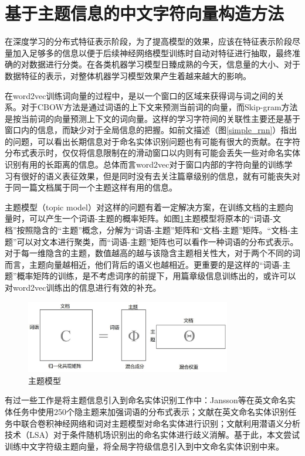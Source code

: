 \documentclass[winfonts,master,oneside,nobackinfo]{njuthesis}
\begin{document}
\section{基于主题信息的中文字符向量构造方法}

在深度学习的分布式特征表示阶段，为了提高模型的效果，应该在特征表示阶段尽量加入足够多的信息以便于后续神经网络模型训练时自动对特征进行抽取，最终准确的对数据进行分类。在各类机器学习模型日臻成熟的今天，信息量的大小、对于数据特征的表示，对整体机器学习模型效果产生着越来越大的影响。

在word2vec训练词向量的过程中，是以一个窗口的区域来获得词与词之间的关系。对于CBOW方法是通过词语的上下文来预测当前词的向量，而Skip-gram方法是按当前词的向量预测上下文的词向量。这样的学习字符间的关联性主要还是基于窗口内的信息，而缺少对于全局信息的把握。如前文描述（图\ref{simple_rnn}）指出的问题，可以看出长期信息对于命名实体识别问题也有可能有很大的贡献。在字符分布式表示时，仅仅将信息限制在的滑动窗口以内则有可能会丢失一些对命名实体识别有用的长距离的信息。总体而言word2vec对于窗口内部的字符向量的训练学习有很好的语义表征效果，但是同时没有去关注篇章级别的信息，就有可能丧失对于同一篇文档属于同一个主题这样有用的信息。

主题模型（topic model）对这样的问题有着一定解决方案，在训练文档的主题向量时，可以产生一个词语-主题的概率矩阵。如图\ref{lda-vec}主题模型将原本的“词语-文档”按照隐含的“主题”概念，分解为“词语-主题”矩阵和“文档-主题”矩阵。“文档-主题”可以对文本进行聚类，而“词语-主题”矩阵也可以看作一种词语的分布式表示。对于每一维隐含的主题，数值越高的越与该隐含主题相关性大，对于两个不同的词而言，主题向量越相近，他们背后的语义也越相近。更重要的是这样的“词语-主题”概率矩阵的训练，是不考虑词序的前提下，用篇章级信息训练出的，或许可以对word2vec训练出的信息进行有效的补充。

\begin{figure}[H]
\centering
\includegraphics[width=0.8\textwidth]{./figure/主题模型.jpg}
\caption{主题模型}
\label{lda-vec}
\end{figure}
有过一些工作是将主题信息引入到命名实体识别工作中：Jansson等\cite{Jansson}在英文命名实体任务中使用250个隐主题来加强词语的分布式表示；文献\cite{kang}在英文命名实体识别任务中联合卷积神经网络和词对主题模型对命名实体进行识别；文献\cite{gong}利用潜语义分析技术（LSA）对于条件随机场识别出的命名实体进行歧义消解。基于此，本文尝试训练中文字符级主题向量，将全局字符级信息引入到中文命名实体识别中来。
\end{document}
